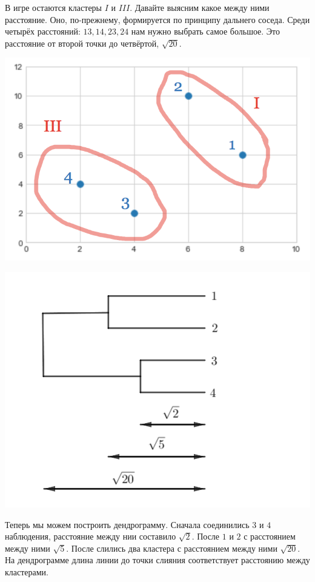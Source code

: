 \documentclass[12pt, a4paper, oneside]{article}
\begin{document}
{В игре остаются кластеры $I$ и $III$.  Давайте выясним какое между ними расстояние. Оно, по-прежнему, формируется по принципу дальнего соседа. Среди четырёх расстояний: $13, 14, 23, 24$ нам нужно выбрать самое большое. Это расстояние от второй точки до четвёртой, $\sqrt{20}$.


\begin{minipage}[t]{0.45\textwidth}
	\includegraphics[scale=0.25]{ekl3.png}
\end{minipage}
\hfill
\begin{minipage}[t]{0.45\textwidth}
	\includegraphics[scale=0.2]{ekl4.png}
\end{minipage}

Теперь мы можем построить дендрограмму. Сначала соединились $3$ и $4$  наблюдения, расстояние между нии составило $\sqrt{2}$. После $1$ и $2$ с расстоянием между ними $\sqrt{5}$. После слились два кластера с расстоянием между ними $\sqrt{20}$. На дендрограмме длина линии до точки слияния соответствует расстоянию между кластерами. 
}
\end{document}

